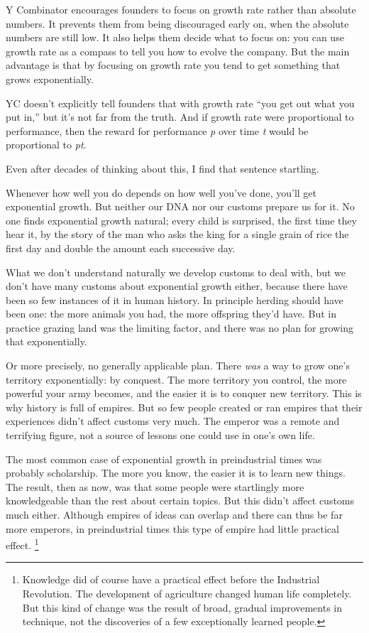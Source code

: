Y Combinator encourages founders to focus on growth rate rather than
absolute numbers. It prevents them from being discouraged early on, when
the absolute numbers are still low. It also helps them decide what to
focus on: you can use growth rate as a compass to tell you how to evolve
the company. But the main advantage is that by focusing on growth rate
you tend to get something that grows exponentially.

YC doesn't explicitly tell founders that with growth rate ``you get out
what you put in,'' but it's not far from the truth. And if growth rate
were proportional to performance, then the reward for performance
\emph{p} over time \emph{t} would be proportional to \emph{pt}.

Even after decades of thinking about this, I find that sentence
startling.

Whenever how well you do depends on how well you've done, you'll get
exponential growth. But neither our DNA nor our customs prepare us for
it. No one finds exponential growth natural; every child is surprised,
the first time they hear it, by the story of the man who asks the king
for a single grain of rice the first day and double the amount each
successive day.

What we don't understand naturally we develop customs to deal with, but
we don't have many customs about exponential growth either, because
there have been so few instances of it in human history. In principle
herding should have been one: the more animals you had, the more
offspring they'd have. But in practice grazing land was the limiting
factor, and there was no plan for growing that exponentially.

Or more precisely, no generally applicable plan. There \emph{was} a way
to grow one's territory exponentially: by conquest. The more territory
you control, the more powerful your army becomes, and the easier it is
to conquer new territory. This is why history is full of empires. But so
few people created or ran empires that their experiences didn't affect
customs very much. The emperor was a remote and terrifying figure, not a
source of lessons one could use in one's own life.

The most common case of exponential growth in preindustrial times was
probably scholarship. The more you know, the easier it is to learn new
things. The result, then as now, was that some people were startlingly
more knowledgeable than the rest about certain topics. But this didn't
affect customs much either. Although empires of ideas can overlap and
there can thus be far more emperors, in preindustrial times this type of
empire had little practical effect. \footnote{Knowledge did of course have a practical effect before the
Industrial Revolution. The development of agriculture changed human life
completely. But this kind of change was the result of broad, gradual
improvements in technique, not the discoveries of a few exceptionally
learned people.}

